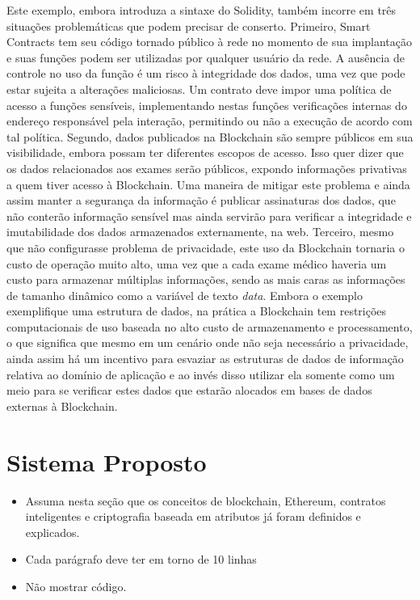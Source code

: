 \documentclass[a4paper,11pt]{article}
\begin{document}
Este exemplo, embora introduza a sintaxe do Solidity, também incorre em três situações problemáticas que podem precisar de conserto. Primeiro, Smart Contracts tem seu código tornado público à rede no momento de sua implantação e suas funções podem ser utilizadas por qualquer usuário da rede. A ausência de controle no uso da função é um risco à integridade dos dados, uma vez que pode estar sujeita a alterações maliciosas. Um contrato deve impor uma política de acesso a funções sensíveis, implementando nestas funções verificações internas do endereço responsável pela interação, permitindo ou não a execução de acordo com tal política. Segundo, dados publicados na Blockchain são sempre públicos em sua visibilidade, embora possam ter diferentes escopos de acesso. Isso quer dizer que os dados relacionados aos exames serão públicos, expondo informações privativas a quem tiver acesso à Blockchain. Uma maneira de mitigar este problema e ainda assim manter a segurança da informação é publicar assinaturas dos dados, que não conterão informação sensível mas ainda servirão para verificar a integridade e imutabilidade dos dados armazenados externamente, na web. Terceiro, mesmo que não configurasse problema de privacidade, este uso da Blockchain tornaria o custo de operação muito alto, uma vez que a cada exame médico haveria um custo para armazenar múltiplas informações, sendo as mais caras as informações de tamanho dinâmico como a variável de texto \emph{data}. Embora o exemplo exemplifique uma estrutura de dados, na prática a Blockchain tem restrições computacionais de uso baseada no alto custo de armazenamento e processamento, o que significa que mesmo em um cenário onde não seja necessário a privacidade, ainda assim há um incentivo para esvaziar as estruturas de dados de informação relativa ao domínio de aplicação e ao invés disso utilizar ela somente como um meio para se verificar estes dados que estarão alocados em bases de dados externas à Blockchain.


\newpage
\section{Sistema Proposto}

\begin{itemize}
    \item {\color{red} Assuma nesta seção que os conceitos de blockchain, Ethereum, contratos inteligentes e criptografia baseada em atributos já foram definidos e explicados.}

    \item {\color{red}Cada parágrafo deve ter em torno de 10 linhas}

    \item {\color{red}Não mostrar código.}

\end{itemize}
\end{document}

